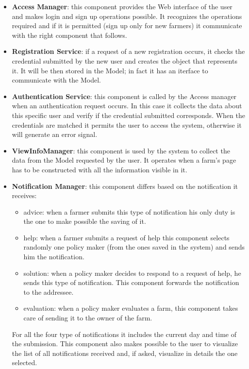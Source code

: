 \begin{itemize}
    \item \textbf{Access Manager}: this component provides the Web interface of the user and makes login and sign up operations possible. It recognizes the operations required and if it is permitted (sign up only for new farmers) it communicate with the right component that follows.
    \item \textbf{Registration Service}: if a request of a new registration occurs, it checks the credential submitted by the new user and creates the object that represents it. It will be then stored in the Model; in fact it has an iterface to communicate with the Model.
    \item \textbf{Authentication Service}: this component is called by the Access manager when an authentication request occurs. In this case it collects the data about this specific user and verify if the credential submitted corresponds. When the credentials are matched it permits the user to access the system, otherwise it will generate an error signal.
    \item \textbf{ViewInfoManager}: this component is used by the system to collect the data from the Model requested by the user. It operates when a farm's page has to be constructed with all the information visible in it.
    \item \textbf{Notification Manager}: this component differs based on the notification it receives:
        \begin{itemize}
            \item advice: when a farmer submits this type of notification his only duty is the one to make possible the saving of it.
            \item help: when a farmer submits a request of help this component selects randomly one policy maker (from the ones saved in the system) and sends him the notification.
            \item solution: when a policy maker decides to respond to a request of help, he sends this type of notification. This component forwards the notification to the addressee.
            \item evaluation: when a policy maker evaluates a farm, this component takes care of sending it to the owner of the farm.
        \end{itemize}
    For all the four type of notifications it includes the current day and time of the submission.
    This component also makes possible to the user to visualize the list of all notifications received and, if asked, visualize in details the one selected.


\end{itemize}
